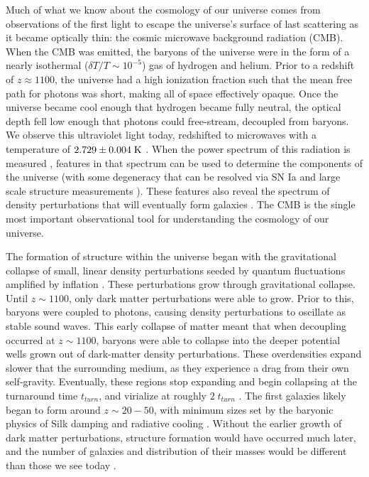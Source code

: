 Much of what we know about the cosmology of our universe comes from observations
of the first light to escape the universe's surface of last scattering as it
became optically thin: the cosmic microwave background radiation (CMB).  
When the CMB was emitted, the baryons of the universe were in the form of a
nearly isothermal ($\delta T/T\sim10^{-5}$) gas of hydrogen and helium.  Prior
to a redshift of $z\approx1100$, the universe had a high ionization fraction
such that the mean free path for photons was short, making all of space
effectively opaque.  Once the universe became cool enough that hydrogen became
fully neutral, the optical depth fell low enough that photons could free-stream,
decoupled from baryons.  We observe this ultraviolet light today, redshifted to
microwaves with a temperature of $2.729\pm0.004\;\rm{K}$ \citep{Fixsen1996}.
When the power spectrum of this radiation is measured \citep{Spergel2003},
features in that spectrum can be used to determine the components of the
universe (with some degeneracy that can be resolved via SN Ia and large scale
structure measurements
\citealt{Riess1998,Perlmutter1999,Beutler2011,Blake2011}). These features also
reveal the spectrum of density perturbations that will eventually form galaxies
\citep{Press1974,Peebles1980}.   The CMB is the single most important
observational tool for understanding the cosmology of our universe.

The formation of structure within the universe began with the gravitational
collapse of small, linear density perturbations seeded by quantum fluctuations
amplified by inflation \citep{Guth1981,Linde1982}.  These perturbations grow
through gravitational collapse.  Until $z\sim1100$, only dark matter
perturbations were able to grow.  Prior to this, baryons were coupled to
photons, causing density perturbations to oscillate as stable sound waves.  This
early collapse of matter meant that when decoupling occurred at $z\sim1100$,
baryons were able to collapse into the deeper potential wells grown out of
dark-matter density perturbations.  These overdensities expand slower that the
surrounding medium, as they experience a drag from their own self-gravity.
Eventually, these regions stop expanding and begin collapsing at the turnaround
time $t_{turn}$, and virialize at roughly $2\;t_{turn}$ \citep{Peebles1980}.
The first galaxies likely began to form around $z\sim20-50$, with minimum sizes
set by the baryonic physics of Silk damping and radiative cooling
\citep{Silk1968}.  Without the earlier growth of dark matter perturbations,
structure formation would have occurred much later, and the number of galaxies
and distribution of their masses would be different than those we see today
\citep{Davis1985}.

